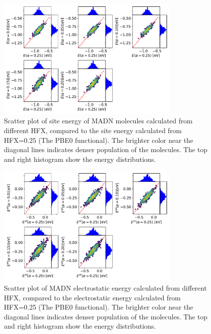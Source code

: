 \documentclass[%
 reprint,
 amsmath,amssymb,
 aps,
]{revtex4-2}
\begin{document}
\begin{figure}
  \centering
  \includegraphics[width=0.80\textwidth]{figs/scatterE_qmmm.pdf}
  \caption{Scatter plot of site energy of MADN molecules calculated from different HFX, compared to the site energy calculated from HFX=0.25 (The PBE0 functional). The brighter color near the diagonal lines indicates denser population of the molecules.  The top and right histogram show the energy distributions.}
  \label{fig:E_qmmm_MADN}
\end{figure}

\begin{figure}
  \centering
  \includegraphics[width=0.80\textwidth]{figs/scatterEstat_qmmm.pdf}
  \caption{Scatter plot of MADN electrostatic energy calculated from different HFX, compared to the electrostatic energy calculated from HFX=0.25 (The PBE0 functional). The brighter color near the diagonal lines indicates denser population of the molecules.  The top and right histogram show the energy distributions.}
  \label{fig:Estat_qmmm_MADN}
\end{figure}
\end{document}

